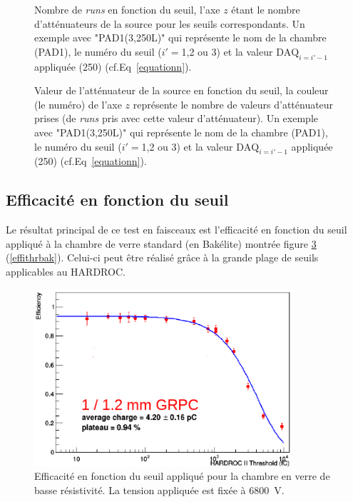 \begin{figure}[ht!]
	\centering
	\caption{Nombre de \textit{runs} en fonction du seuil, l'axe $z$ étant le nombre d'atténuateurs de la source pour les seuils correspondants. Un exemple avec "PAD1(3,250L)" qui représente le nom de la chambre (PAD1), le numéro du seuil ($i'=$1,2 ou 3) et la valeur $\mbox{DAQ}_{i=i'-1}$ appliquée (250) (cf.Eq~\ref{equationn}).}
	\label{elogutil3}	
\end{figure}

\begin{figure}[ht!]
	\centering
	\caption{Valeur de l'atténuateur de la source en fonction du seuil, la couleur (le numéro) de l'axe $z$ représente le nombre de valeurs d'atténuateur prises (de \textit{runs} pris avec cette valeur d'atténuateur). Un exemple avec "PAD1(3,250L)" qui représente le nom de la chambre (PAD1), le numéro du seuil ($i'=$1,2 ou 3) et la valeur $\mbox{DAQ}_{i=i'-1}$ appliquée (250) (cf.Eq~\ref{equationn}).}
	\label{elogutil4}	
\end{figure}

\subsection{Efficacité en fonction du seuil}
Le résultat principal de ce test en faisceaux est l'efficacité en fonction du seuil appliqué à la chambre de verre standard (en Bakélite) montrée figure \ref{effithrchi} (\ref{effithrbak}). Celui-ci peut être réalisé grâce à la grande plage de seuils applicables au HARDROC.

\begin{figure}[ht!]
	\centering
	\includegraphics[width=0.85\textwidth]{GLA/effithrchi.png}
	\captionsetup{type=figure}\caption{Efficacité en fonction du seuil appliqué pour la chambre en verre de basse résistivité. La tension appliquée est fixée à \SI{6800}{\volt}.}
	\label{effithrchi}
\end{figure}

